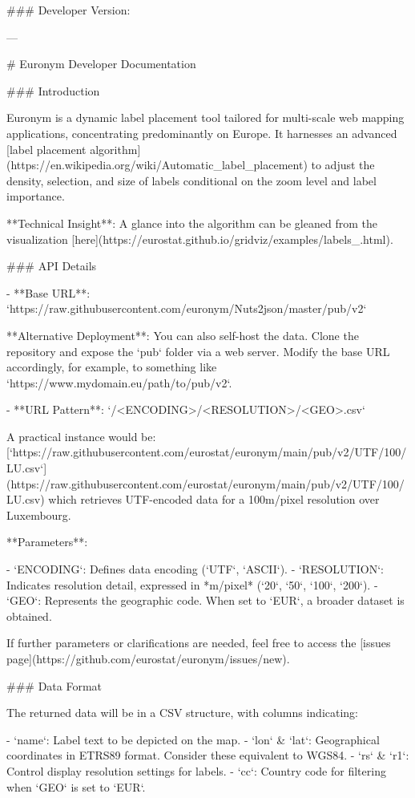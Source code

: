 ### Developer Version:

---

# Euronym Developer Documentation

### Introduction

Euronym is a dynamic label placement tool tailored for multi-scale web mapping applications, concentrating predominantly on Europe. It harnesses an advanced [label placement algorithm](https://en.wikipedia.org/wiki/Automatic_label_placement) to adjust the density, selection, and size of labels conditional on the zoom level and label importance.

**Technical Insight**: A glance into the algorithm can be gleaned from the visualization [here](https://eurostat.github.io/gridviz/examples/labels_.html).

### API Details

- **Base URL**: `https://raw.githubusercontent.com/euronym/Nuts2json/master/pub/v2`

  **Alternative Deployment**: You can also self-host the data. Clone the repository and expose the `pub` folder via a web server. Modify the base URL accordingly, for example, to something like `https://www.mydomain.eu/path/to/pub/v2`.

- **URL Pattern**: `/<ENCODING>/<RESOLUTION>/<GEO>.csv`

  A practical instance would be: [`https://raw.githubusercontent.com/eurostat/euronym/main/pub/v2/UTF/100/LU.csv`](https://raw.githubusercontent.com/eurostat/euronym/main/pub/v2/UTF/100/LU.csv) which retrieves UTF-encoded data for a 100m/pixel resolution over Luxembourg.

  **Parameters**:

  - `ENCODING`: Defines data encoding (`UTF`, `ASCII`).
  - `RESOLUTION`: Indicates resolution detail, expressed in *m/pixel* (`20`, `50`, `100`, `200`).
  - `GEO`: Represents the geographic code. When set to `EUR`, a broader dataset is obtained.

  If further parameters or clarifications are needed, feel free to access the [issues page](https://github.com/eurostat/euronym/issues/new).

### Data Format

The returned data will be in a CSV structure, with columns indicating:

- `name`: Label text to be depicted on the map.
- `lon` & `lat`: Geographical coordinates in ETRS89 format. Consider these equivalent to WGS84.
- `rs` & `r1`: Control display resolution settings for labels.
- `cc`: Country code for filtering when `GEO` is set to `EUR`.

